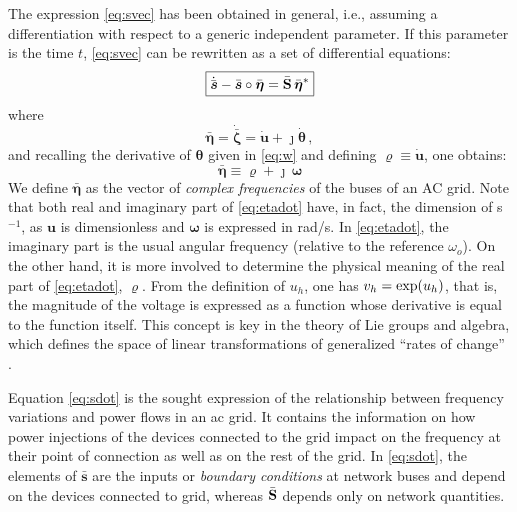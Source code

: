 \documentclass[journal, twocolumn, letter]{IEEEtran}
\newcommand{\bfg}[1]{\boldsymbol{#1}}
\newcommand{\bfb}[1]{\boldsymbol{\rm #1}}
\newcommand{\Dt}{\dot}
\newcommand{\vh}{v_h}
\newcommand{\uh}{u_h}
\newcommand{\wo}{\omega_o}
\newcommand{\jj}{\jmath}
\newcommand{\svec}{\bar{\bfg s}}
\newcommand{\uvec}{\bfg u}
\newcommand{\sdot}{\dot{\bar{\bfg s}}}
\newcommand{\evec}{\bar{\bfg \eta}}
\newcommand{\rhovec}{\bfg \varrho}
\newcommand{\wvec}{\bfg \omega}
\newcommand{\zvec}{\bar{\bfg \zeta}}
\newcommand{\tvec}{\bfg \theta}
\newcommand{\Sbus}{\bar{\bfb S}}
\begin{document}
The expression \eqref{eq:svec} has been obtained in general, i.e.,
assuming a differentiation with respect to a generic independent
parameter.  If this parameter is the time $t$, \eqref{eq:svec} can be
rewritten as a set of differential equations:
\begin{equation}
  \label{eq:sdot}
  \boxed{ \sdot - \svec \circ \evec = \Sbus \, \evec^* }
\end{equation}
where
\begin{equation}
  \label{eq:etadot0}
    \evec = \Dt {\zvec} = \Dt {\uvec} + \jj \Dt {\tvec} \, ,
\end{equation}
and recalling the derivative of $\tvec$ given in \eqref{eq:w} and
defining $\rhovec \equiv \dot{\uvec}$, one obtains:
\begin{equation}
  \label{eq:etadot}
  \boxed{ \evec \equiv \rhovec + \jj \, \wvec }
\end{equation}
We define $\evec$ as the vector of \textit{complex frequencies} of the
buses of an AC grid.  Note that both real and imaginary part of
\eqref{eq:etadot} have, in fact, the dimension of s$^{-1}$, as $\uvec$
is dimensionless  and $\wvec$ is expressed in rad/s.  In
\eqref{eq:etadot}, the imaginary part is the usual angular frequency
(relative to the reference $\wo$).  On the other hand, it is more
involved to determine the physical meaning of the real part of
\eqref{eq:etadot}, $\rhovec$.  From the definition of $\uh$, one has
$\vh = {\rm exp}(\uh)$, that is, the magnitude of the voltage is
expressed as a function whose derivative  is equal to the
function itself.  This concept is key in the theory of Lie groups and
algebra, which defines the space of linear transformations of
generalized ``rates of change'' \cite{Stephani:1990}.



Equation \eqref{eq:sdot} is the sought expression of the relationship
between frequency variations and power flows in an ac grid.  It
contains the information on how power injections of the devices
connected to the grid impact on the frequency at their point of
connection as well as on the rest of the grid.  In \eqref{eq:sdot},
the elements of $\svec$ are the inputs or \textit{boundary conditions}
at network buses and depend on the devices connected to grid, whereas
$\Sbus$ depends only on network quantities. 
\end{document}
